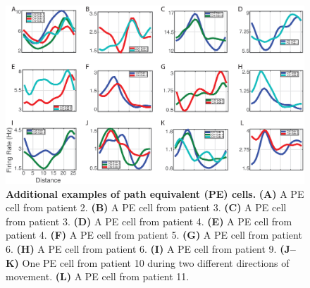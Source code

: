 \clearpage
\begin{figure}[bh]
\centering
\includegraphics[width=1\textwidth]{./tex/linearGrids/figs/supp_extra_cells_large}
\caption[Additional examples of path equivalent (PE) cells]{\textbf{Additional examples of path equivalent (PE) cells.} \textbf{(A)} A PE cell from patient 2. \textbf{(B)} A PE cell from patient 3. \textbf{(C)} A PE cell from patient 3. \textbf{(D)} A PE cell from patient 4. \textbf{(E)} A PE cell from patient 4. \textbf{(F)} A PE cell from patient 5. \textbf{(G)} A PE cell from patient 6. \textbf{(H)} A PE cell from patient 6. \textbf{(I)}  A PE cell from patient 9. \textbf{(J--K)} One PE cell from patient 10 during two different directions of movement. \textbf{(L)}  A PE cell from patient 11.}
\label{fig:subOtherEx}
\end{figure}


